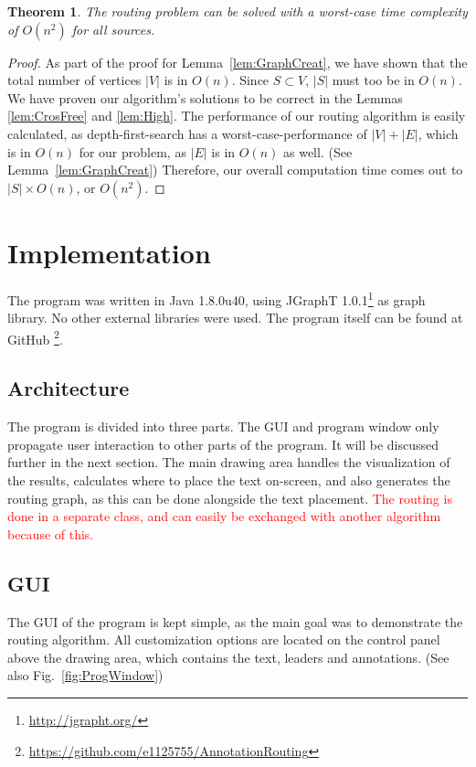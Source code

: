 \documentclass[11pt,a4paper]{vutinfth}
\newtheorem{theorem}{Theorem}
\newcommand{\change}[1]{\textcolor{red}{#1}}
\begin{document}
\begin{theorem}
	The routing problem can be solved with a worst-case time complexity of $O(n^2)$ for all sources.
\end{theorem}
\begin{proof}
	As part of the proof for Lemma~\ref*{lem:GraphCreat}, we have shown that the total number of vertices $|V|$ is in $O(n)$. Since $S \subset V$, $|S|$ must too be in $O(n)$. 
	We have proven our algorithm's solutions to be correct in the Lemmas \ref*{lem:CrosFree} and \ref*{lem:High}.
	The performance of our routing algorithm is easily calculated, as depth-first-search has a worst-case-performance of $|V|+|E|$, which is in $O(n)$ for our problem, as $|E|$ is in $O(n)$ as well. (See Lemma~\ref*{lem:GraphCreat})
	Therefore, our overall computation time comes out to $|S| \times O(n)$, or $O(n^2)$.
\end{proof}


\chapter{Implementation}
The program was written in Java 1.8.0u40, using JGraphT 1.0.1\footnote{\url{http://jgrapht.org/}} as graph library. No other external libraries were used.
The program itself can be found at GitHub \footnote{\url{https://github.com/e1125755/AnnotationRouting}}.

\section{Architecture}
The program is divided into three parts. The GUI and program window only propagate user interaction to other parts of the program. It will be discussed further in the next section.
The main drawing area handles the visualization of the results, calculates where to place the text on-screen, and also generates the routing graph, as this can be done alongside the text placement.
\change{The routing is done in a separate class, and can easily be exchanged with another algorithm because of this.}
\section{GUI}
\label{sec:GUI}

The GUI of the program is kept simple, as the main goal was to demonstrate the routing algorithm. All customization options are located on the control panel above the drawing area, which contains the text, leaders and annotations. (See also Fig.~\ref*{fig:ProgWindow})
\end{document}
